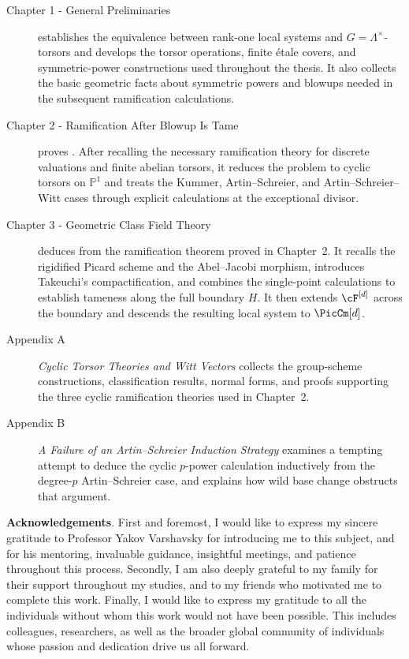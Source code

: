 \begin{description}
    \item[Chapter 1 - General Preliminaries] establishes the equivalence between rank-one local systems and $G=\Lambda^\times$-torsors and develops the torsor operations, finite \'etale covers, and symmetric-power constructions used throughout the thesis. It also collects the basic geometric facts about symmetric powers and blowups needed in the subsequent ramification calculations.
    \item[Chapter 2 - Ramification After Blowup Is Tame] proves . After recalling the necessary ramification theory for discrete valuations and finite abelian torsors, it reduces the problem to cyclic torsors on $\mathbb P^1$ and treats the Kummer, Artin--Schreier, and Artin--Schreier--Witt cases through explicit calculations at the exceptional divisor.
    \item[Chapter 3 - Geometric Class Field Theory] deduces  from the ramification theorem proved in Chapter~2. It recalls the rigidified Picard scheme and the Abel--Jacobi morphism, introduces Takeuchi's compactification, and combines the single-point calculations to establish tameness along the full boundary $H$. It then extends $\cF^{[d]}$ across the boundary and descends the resulting local system to $\PicCm[d]$.
    \item[Appendix A] \emph{Cyclic Torsor Theories and Witt Vectors} collects the group-scheme constructions, classification results, normal forms, and proofs supporting the three cyclic ramification theories used in Chapter~2.
    \item[Appendix B] \emph{A Failure of an Artin--Schreier Induction Strategy} examines a tempting attempt to deduce the cyclic $p$-power calculation inductively from the degree-$p$ Artin--Schreier case, and explains how wild base change obstructs that argument.
\end{description}

\noindent \textbf{Acknowledgements}. First and foremost, I would like to express my sincere gratitude to Professor Yakov Varshavsky for introducing me to this subject, and for his mentoring, invaluable guidance, insightful meetings, and patience throughout this process.
Secondly, I am also deeply grateful to my family for their support throughout my studies, and to my friends who motivated me to complete this work.
Finally, I would like to express my gratitude to all the individuals without whom this work would not have been possible. This includes colleagues, researchers, as well as the broader global community of individuals whose passion and dedication drive us all forward.

